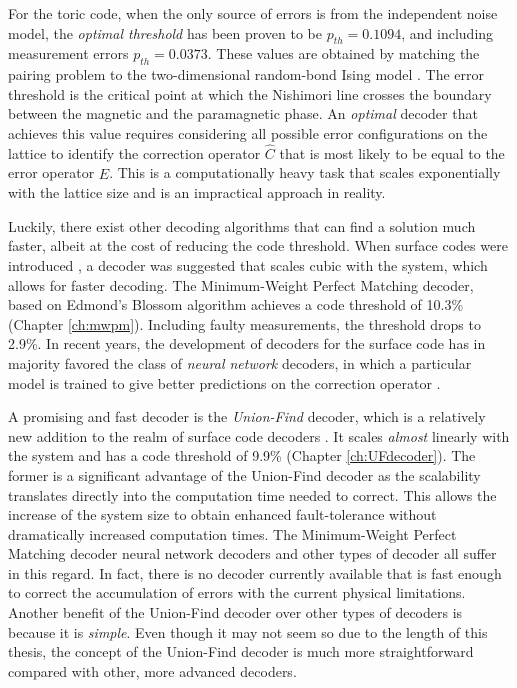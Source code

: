 For the toric code, when the only source of errors is from the independent noise model, the \emph{optimal threshold} has been proven to be $p_{th}=0.1094$, and including measurement errors $p_{th} = 0.0373$. These values are obtained by matching the pairing problem to the two-dimensional random-bond Ising model \cite{dennis2002topological}. The error threshold is the critical point at which the Nishimori line crosses the boundary between the magnetic and the paramagnetic phase. An \emph{optimal} decoder that achieves this value requires considering all possible error configurations on the lattice to identify the correction operator $\hat{C}$ that is most likely to be equal to the error operator $\hat{E}$. This is a computationally heavy task that scales exponentially with the lattice size and is an impractical approach in reality.

Luckily, there exist other decoding algorithms that can find a solution much faster, albeit at the cost of reducing the code threshold. When surface codes were introduced \cite{dennis2002topological}, a decoder was suggested that scales cubic with the system, which allows for faster decoding. The Minimum-Weight Perfect Matching decoder, based on Edmond's Blossom algorithm achieves a code threshold of 10.3\% (Chapter \ref{ch:mwpm}). Including faulty measurements, the threshold drops to 2.9\%. In recent years, the development of decoders for the surface code has in majority favored the class of \emph{neural network} decoders, in which a particular model is trained to give better predictions on the correction operator \cite{breuckmann2018scalable, nautrup2019optimizing, varsamopoulos2017decoding, varsamopoulos2020decoding}. 

A promising and fast decoder is the \emph{Union-Find} decoder, which is a relatively new addition to the realm of surface code decoders \cite{delfosse2017almost}. It scales \emph{almost} linearly with the system and has a code threshold of 9.9\% (Chapter \ref{ch:UFdecoder}). The former is a significant advantage of the Union-Find decoder as the scalability translates directly into the computation time needed to correct. This allows the increase of the system size to obtain enhanced fault-tolerance without dramatically increased computation times. The Minimum-Weight Perfect Matching decoder neural network decoders and other types of decoder all suffer in this regard. In fact, there is no decoder currently available that is fast enough to correct the accumulation of errors with the current physical limitations. Another benefit of the Union-Find decoder over other types of decoders is because it is \emph{simple}. Even though it may not seem so due to the length of this thesis, the concept of the Union-Find decoder is much more straightforward compared with other, more advanced decoders. 

